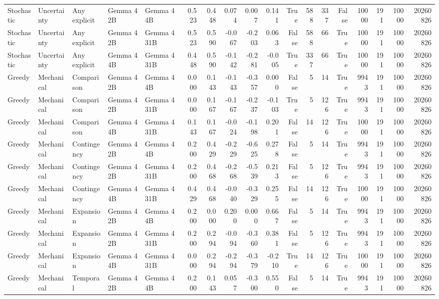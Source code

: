 \begin{tabular}{lllllrrrrrrrrrrrrr}
Stochastic & Uncertainty & Any explicit & Gemma 4 2B & Gemma 4 4B & 0.523 & 0.448 & 0.074 & 0.007 & 0.141 & True & 588 & 337 & False & 10000 & 191 & 10000 & 20260826 \\
Stochastic & Uncertainty & Any explicit & Gemma 4 2B & Gemma 4 31B & 0.523 & 0.590 & -0.067 & -0.203 & 0.063 & False & 588 & 66 & True & 10000 & 191 & 10000 & 20260826 \\
Stochastic & Uncertainty & Any explicit & Gemma 4 4B & Gemma 4 31B & 0.448 & 0.590 & -0.142 & -0.281 & -0.005 & True & 337 & 66 & True & 10000 & 191 & 10000 & 20260826 \\
Greedy & Mechanical & Comparison & Gemma 4 2B & Gemma 4 4B & 0.000 & 0.143 & -0.143 & -0.357 & 0.000 & False & 5 & 14 & True & 9943 & 191 & 10000 & 20260826 \\
Greedy & Mechanical & Comparison & Gemma 4 2B & Gemma 4 31B & 0.000 & 0.167 & -0.167 & -0.237 & -0.103 & True & 5 & 126 & True & 9943 & 191 & 10000 & 20260826 \\
Greedy & Mechanical & Comparison & Gemma 4 4B & Gemma 4 31B & 0.143 & 0.167 & -0.024 & -0.198 & 0.201 & False & 14 & 126 & True & 10000 & 191 & 10000 & 20260826 \\
Greedy & Mechanical & Contingency & Gemma 4 2B & Gemma 4 4B & 0.200 & 0.429 & -0.229 & -0.625 & 0.278 & False & 5 & 14 & True & 9943 & 191 & 10000 & 20260826 \\
Greedy & Mechanical & Contingency & Gemma 4 2B & Gemma 4 31B & 0.200 & 0.468 & -0.268 & -0.539 & 0.213 & False & 5 & 126 & True & 9943 & 191 & 10000 & 20260826 \\
Greedy & Mechanical & Contingency & Gemma 4 4B & Gemma 4 31B & 0.429 & 0.468 & -0.040 & -0.329 & 0.255 & False & 14 & 126 & True & 10000 & 191 & 10000 & 20260826 \\
Greedy & Mechanical & Expansion & Gemma 4 2B & Gemma 4 4B & 0.200 & 0.000 & 0.200 & 0.000 & 0.667 & False & 5 & 14 & True & 9943 & 191 & 10000 & 20260826 \\
Greedy & Mechanical & Expansion & Gemma 4 2B & Gemma 4 31B & 0.200 & 0.294 & -0.094 & -0.360 & 0.381 & False & 5 & 126 & True & 9943 & 191 & 10000 & 20260826 \\
Greedy & Mechanical & Expansion & Gemma 4 4B & Gemma 4 31B & 0.000 & 0.294 & -0.294 & -0.379 & -0.210 & True & 14 & 126 & True & 10000 & 191 & 10000 & 20260826 \\
Greedy & Mechanical & Temporal & Gemma 4 2B & Gemma 4 4B & 0.200 & 0.143 & 0.057 & -0.300 & 0.550 & False & 5 & 14 & True & 9943 & 191 & 10000 & 20260826 \\

\end{tabular}
